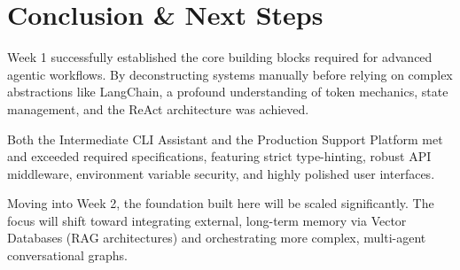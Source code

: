 \documentclass[12pt, a4paper]{article}
\begin{document}
\newpage
\section{Conclusion \& Next Steps}
Week 1 successfully established the core building blocks required for advanced agentic workflows. By deconstructing systems manually before relying on complex abstractions like LangChain, a profound understanding of token mechanics, state management, and the ReAct architecture was achieved. 

Both the Intermediate CLI Assistant and the Production Support Platform met and exceeded required specifications, featuring strict type-hinting, robust API middleware, environment variable security, and highly polished user interfaces.

Moving into Week 2, the foundation built here will be scaled significantly. The focus will shift toward integrating external, long-term memory via Vector Databases (RAG architectures) and orchestrating more complex, multi-agent conversational graphs.
\end{document}
